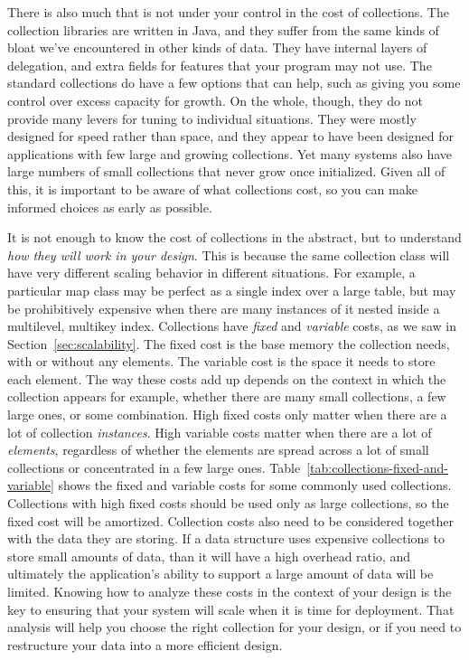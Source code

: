 There is also much that is not under your control in the cost of
collections.
The collection libraries are written in Java, and they suffer
from the same kinds of bloat we've encountered in other kinds of data. They have internal layers of delegation,
and extra fields for features that your program may not use. The standard
collections do have a few options that can help, such as giving you some control over 
excess capacity for growth. On the whole, though, they do not provide many
levers for tuning to individual situations. They were mostly designed for speed rather than space, and
they appear to have been designed for applications with  
few large and growing collections. Yet many systems also have large numbers
of small collections that never grow once initialized. Given all of this, it is important
to be aware of what collections cost, so you can make informed choices as early as possible. 

It is not enough to know the cost of collections in the abstract, but to
understand \emph{how they will work in your design}. This is because the same
collection class will have very different scaling behavior in different
situations. For example, a particular map class may be perfect as a single index
over a large table, but may be prohibitively expensive
when there are many instances of it nested inside a multilevel,
multikey index. Collections have \emph{fixed} and \emph{variable} costs, as we saw
in Section~\ref{sec:scalability}. The fixed cost is the base memory
the collection needs, with or without any elements.
The variable cost is the space it needs to store each
element. The way these costs add up
depends on the context in which the collection appears
for example, whether
there are many small collections, a few large ones, or some
combination. High fixed costs only matter when
there are a lot of collection \emph{instances}. High variable costs matter when
there are a lot of \emph{elements}, regardless of whether the elements are
spread across a lot of small collections
or concentrated in a few large ones.
Table~\ref{tab:collections-fixed-and-variable} shows the fixed and variable
costs for some commonly used collections.  %
Collections with high fixed costs should be used only as large collections, so
the fixed cost will be amortized. 
Collection costs also need to be
considered together with the data they are storing. If a data structure uses expensive collections to store small amounts of data, than it
will have a high overhead ratio, and ultimately the application's ability to
support a large amount of data will be limited. Knowing how to analyze these costs
in the context of your design is the key to ensuring that your system will scale when it is time for deployment. That analysis will help you choose the right collection for your
design, or if you need to restructure your data into a more efficient design.

